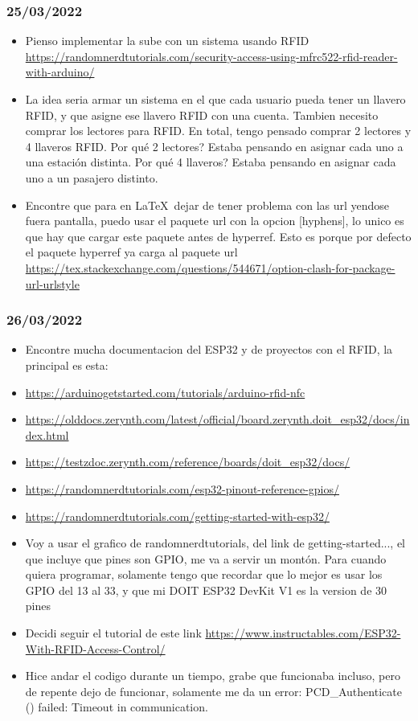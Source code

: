 \documentclass{article}
\begin{document}
\subsubsection{25/03/2022}
\begin{itemize}
	\item Pienso implementar la sube con un sistema usando RFID\\
	      \small{\url{https://randomnerdtutorials.com/security-access-using-mfrc522-rfid-reader-with-arduino/}}
	\item La idea seria armar un sistema en el que cada usuario pueda tener un llavero
	      RFID, y que asigne ese llavero RFID con una cuenta.
	      Tambien necesito comprar los lectores para RFID.
	      En total, tengo pensado comprar 2 lectores y 4 llaveros RFID.
	      Por qué 2 lectores? Estaba pensando en asignar cada uno a una estación distinta.
	      Por qué 4 llaveros? Estaba pensando en asignar cada uno a un pasajero distinto.
	\item Encontre que para en \LaTeX \ dejar de tener problema con las url yendose fuera
	      pantalla, puedo usar el paquete url con la opcion [hyphens], lo
	      unico es que hay que cargar este paquete antes de hyperref.
	      Esto es porque por defecto el paquete hyperref ya carga al paquete url
	      \url{https://tex.stackexchange.com/questions/544671/option-clash-for-package-url-urlstyle}

\end{itemize}
\subsubsection{26/03/2022}
\begin{itemize}
	\item Encontre mucha documentacion del ESP32 y de proyectos con el RFID, la principal es esta:
	\item \url{https://arduinogetstarted.com/tutorials/arduino-rfid-nfc}
	\item \url{https://olddocs.zerynth.com/latest/official/board.zerynth.doit_esp32/docs/index.html}
	\item \url{https://testzdoc.zerynth.com/reference/boards/doit_esp32/docs/}
	\item \url{https://randomnerdtutorials.com/esp32-pinout-reference-gpios/}
	\item \url{https://randomnerdtutorials.com/getting-started-with-esp32/}
	\item Voy a usar el grafico de randomnerdtutorials, del link de getting-started...,
	      el que incluye que pines son GPIO, me va a servir un montón.
	      Para cuando quiera programar, solamente tengo que recordar que lo mejor es usar los
	      GPIO del 13 al 33, y que mi DOIT ESP32 DevKit V1 es la version de 30 pines
	\item Decidi seguir el tutorial de este link \url{https://www.instructables.com/ESP32-With-RFID-Access-Control/}
	\item Hice andar el codigo durante un tiempo, grabe que funcionaba incluso, pero de
	      repente dejo de funcionar, solamente me da un error:
	      PCD\_Authenticate () failed: Timeout in communication.

\end{itemize}
\end{document}
